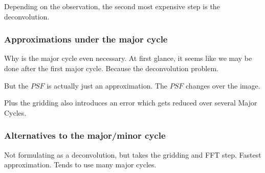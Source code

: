 Depending on the observation, the second most expensive step is the deconvolution.


\subsubsection{Approximations under the major cycle} \label{intro:major:approximations}
Why is the major cycle even necessary. At first glance, it seems like we may be done after the first major cycle. Because the deconvolution problem.

But the $PSF$ is actually just an approximation. The $PSF$ changes over the image.

Plus the gridding also introduces an error which gets reduced over several Major Cycles.

\subsubsection{Alternatives to the major/minor cycle}
Not formulating as a deconvolution, but takes the gridding and FFT step. Fastest approximation. Tends to use many major cycles.
